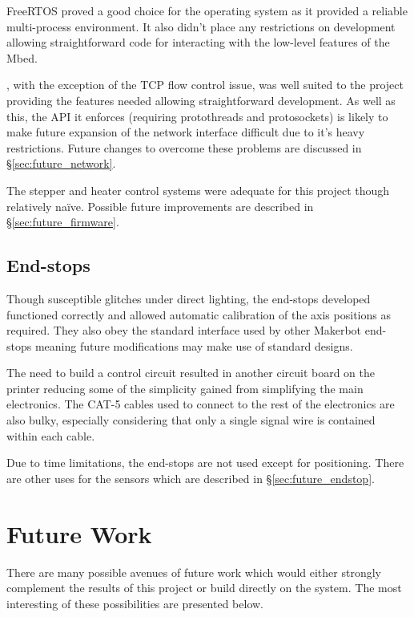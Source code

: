 			FreeRTOS proved a good choice for the operating system as it provided a
			reliable multi-process environment. It also didn't place any restrictions
			on development allowing straightforward code for interacting with the
			low-level features of the Mbed.
			
			\uIP{}, with the exception of the TCP flow control issue, was well suited
			to the project providing the features needed allowing straightforward
			development. As well as this, the API it enforces (requiring protothreads
			and protosockets) is likely to make future expansion of the network
			interface difficult due to it's heavy restrictions. Future changes to
			overcome these problems are discussed in \S\ref{sec:future_network}.
			
			The stepper and heater control systems were adequate for this project
			though relatively na\"ive. Possible future improvements are described in
			\S\ref{sec:future_firmware}.
		
		\subsection{End-stops}
			
			Though susceptible glitches under direct lighting, the end-stops developed
			functioned correctly and allowed automatic calibration of the axis
			positions as required. They also obey the standard interface used by other
			Makerbot end-stops meaning future modifications may make use of standard
			designs.
			
			The need to build a control circuit resulted in another circuit board on
			the printer reducing some of the simplicity gained from simplifying the
			main electronics. The CAT-5 cables used to connect to the rest of the
			electronics are also bulky, especially considering that only a single
			signal wire is contained within each cable.
			
			Due to time limitations, the end-stops are not used except for
			positioning. There are other uses for the sensors which are described in
			\S\ref{sec:future_endstop}.
		
	\section{Future Work}
		
		There are many possible avenues of future work which would either strongly
		complement the results of this project or build directly on the system. The
		most interesting of these possibilities are presented below.
		
